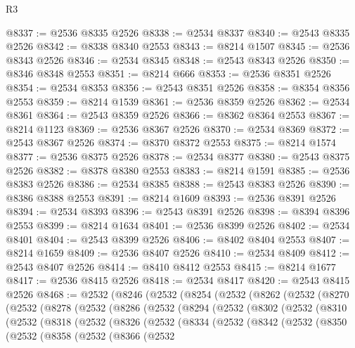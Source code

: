 \begin{lexlean}{R3}
\begin{coremodule}
@8337 := @2536 @8335 @2526
@8338 := @2534 @8337
@8340 := @2543 @8335 @2526
@8342 := @8338 @8340 @2553
@8343 := @8214 @1507
@8345 := @2536 @8343 @2526
@8346 := @2534 @8345
@8348 := @2543 @8343 @2526
@8350 := @8346 @8348 @2553
@8351 := @8214 @666
@8353 := @2536 @8351 @2526
@8354 := @2534 @8353
@8356 := @2543 @8351 @2526
@8358 := @8354 @8356 @2553
@8359 := @8214 @1539
@8361 := @2536 @8359 @2526
@8362 := @2534 @8361
@8364 := @2543 @8359 @2526
@8366 := @8362 @8364 @2553
@8367 := @8214 @1123
@8369 := @2536 @8367 @2526
@8370 := @2534 @8369
@8372 := @2543 @8367 @2526
@8374 := @8370 @8372 @2553
@8375 := @8214 @1574
@8377 := @2536 @8375 @2526
@8378 := @2534 @8377
@8380 := @2543 @8375 @2526
@8382 := @8378 @8380 @2553
@8383 := @8214 @1591
@8385 := @2536 @8383 @2526
@8386 := @2534 @8385
@8388 := @2543 @8383 @2526
@8390 := @8386 @8388 @2553
@8391 := @8214 @1609
@8393 := @2536 @8391 @2526
@8394 := @2534 @8393
@8396 := @2543 @8391 @2526
@8398 := @8394 @8396 @2553
@8399 := @8214 @1634
@8401 := @2536 @8399 @2526
@8402 := @2534 @8401
@8404 := @2543 @8399 @2526
@8406 := @8402 @8404 @2553
@8407 := @8214 @1659
@8409 := @2536 @8407 @2526
@8410 := @2534 @8409
@8412 := @2543 @8407 @2526
@8414 := @8410 @8412 @2553
@8415 := @8214 @1677
@8417 := @2536 @8415 @2526
@8418 := @2534 @8417
@8420 := @2543 @8415 @2526
@8468 := @2532
    (@8246
      (@2532
        (@8254
          (@2532
            (@8262
              (@2532
                (@8270
                  (@2532
                    (@8278
                      (@2532
                        (@8286
                          (@2532
                            (@8294
                              (@2532
                                (@8302
                                  (@2532
                                    (@8310
                                      (@2532
                                        (@8318
                                          (@2532
                                            (@8326
                                              (@2532
                                                (@8334
                                                  (@2532
                                                    (@8342
                                                      (@2532
                                                        (@8350
                                                          (@2532
                                                            (@8358
                                                              (@2532
                                                                (@8366
                                                                  (@2532

\end{coremodule}
\end{lexlean}
